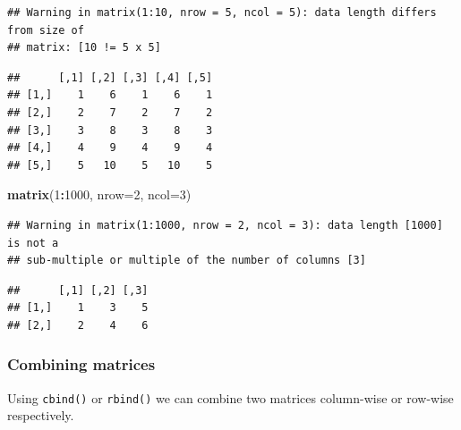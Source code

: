 \documentclass[
]{book}
\newenvironment{Shaded}{\begin{snugshade}}{\end{snugshade}}
\newcommand{\AttributeTok}[1]{\textcolor[rgb]{0.13,0.29,0.53}{#1}}
\newcommand{\DecValTok}[1]{\textcolor[rgb]{0.00,0.00,0.81}{#1}}
\newcommand{\FunctionTok}[1]{\textcolor[rgb]{0.13,0.29,0.53}{\textbf{#1}}}
\newcommand{\NormalTok}[1]{#1}
\newcommand{\SpecialCharTok}[1]{\textcolor[rgb]{0.81,0.36,0.00}{\textbf{#1}}}
\begin{document}
\begin{verbatim}
## Warning in matrix(1:10, nrow = 5, ncol = 5): data length differs from size of
## matrix: [10 != 5 x 5]
\end{verbatim}

\begin{verbatim}
##      [,1] [,2] [,3] [,4] [,5]
## [1,]    1    6    1    6    1
## [2,]    2    7    2    7    2
## [3,]    3    8    3    8    3
## [4,]    4    9    4    9    4
## [5,]    5   10    5   10    5
\end{verbatim}

\begin{Shaded}
\begin{Highlighting}[]
\FunctionTok{matrix}\NormalTok{(}\DecValTok{1}\SpecialCharTok{:}\DecValTok{1000}\NormalTok{, }\AttributeTok{nrow=}\DecValTok{2}\NormalTok{, }\AttributeTok{ncol=}\DecValTok{3}\NormalTok{)}
\end{Highlighting}
\end{Shaded}

\begin{verbatim}
## Warning in matrix(1:1000, nrow = 2, ncol = 3): data length [1000] is not a
## sub-multiple or multiple of the number of columns [3]
\end{verbatim}

\begin{verbatim}
##      [,1] [,2] [,3]
## [1,]    1    3    5
## [2,]    2    4    6
\end{verbatim}

\hypertarget{combining-matrices}{%
\subsubsection*{Combining matrices}\label{combining-matrices}}

Using \texttt{cbind()} or \texttt{rbind()} we can combine two matrices column-wise or row-wise respectively.
\end{document}
